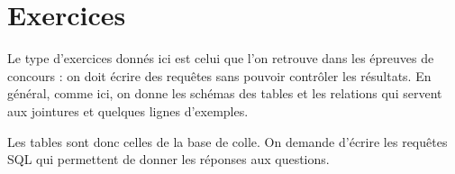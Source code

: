 \section{Exercices} 
Le type d'exercices donnés ici est celui que l'on retrouve dans les épreuves de concours : on doit écrire des requêtes sans pouvoir contrôler les résultats. En général, comme ici, on donne les schémas des tables et les relations qui servent aux jointures et quelques lignes d'exemples.

Les tables sont donc celles de la base de colle. On demande d'écrire les requêtes SQL qui permettent de donner les réponses aux questions.
